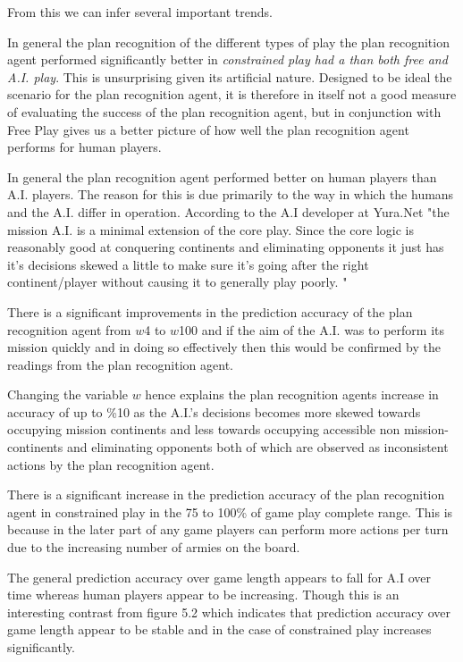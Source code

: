 \documentclass[parskip]{cs4rep}
\begin{document}
From this we can infer several important trends.

In general the plan recognition of the different types of play the plan recognition agent performed significantly better in \textit{constrained play had a than both free and A.I. play}. This is unsurprising given its artificial nature. Designed to be ideal the scenario for the plan recognition agent, it is therefore in itself not a good measure of evaluating the success of the plan recognition agent, but in conjunction with Free Play gives us a better picture of how well the plan recognition agent performs for human players.

In general the plan recognition agent performed better on human players than A.I. players. The reason for this is due primarily to the way in which the humans and the A.I. differ in operation. According to the A.I developer at Yura.Net "the mission A.I. is a minimal extension of the core play. Since the core logic is reasonably good at conquering continents and eliminating opponents it just has it's decisions skewed a little to make sure it's going after the right continent/player without causing it to generally play poorly. "

There is a significant improvements in the prediction accuracy of the plan recognition agent from $w$4 to $w$100 and if the aim of the A.I. was to perform its mission quickly and in doing so effectively then this would be confirmed by the readings from the plan recognition agent.

Changing the variable $w$ hence explains the plan recognition agents increase in accuracy of up to \%10  as the A.I.'s decisions becomes more skewed towards occupying mission continents and less towards occupying accessible non mission-continents and eliminating opponents both of which are observed as inconsistent actions by the plan recognition agent.

There is a significant increase in the prediction accuracy of the plan recognition agent in constrained play in the 75 to 100\% of game play complete range. This is because in the later part of any game players can perform more actions per turn due to the increasing number of armies on the board.

The general prediction accuracy over game length appears to fall for A.I over time whereas human players appear to be increasing. Though this is an interesting contrast from figure 5.2 which indicates that prediction accuracy over game length appear to be stable and in the case of constrained play increases significantly.
\end{document}
